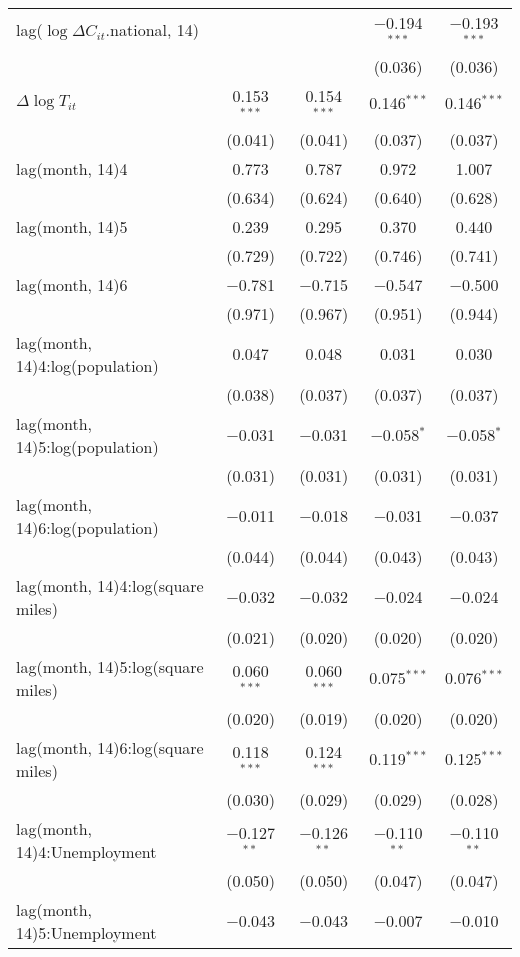 \begin{tabular}{@{\extracolsep{1pt}}lcccc}
  lag($\log \Delta C_{it}$.national, 14) &  &  & $-$0.194$^{***}$ & $-$0.193$^{***}$ \\ 
  &  &  & (0.036) & (0.036) \\ 
  $\Delta \log T_{it}$ & 0.153$^{***}$ & 0.154$^{***}$ & 0.146$^{***}$ & 0.146$^{***}$ \\ 
  & (0.041) & (0.041) & (0.037) & (0.037) \\ 
  lag(month, 14)4 & 0.773 & 0.787 & 0.972 & 1.007 \\ 
  & (0.634) & (0.624) & (0.640) & (0.628) \\ 
  lag(month, 14)5 & 0.239 & 0.295 & 0.370 & 0.440 \\ 
  & (0.729) & (0.722) & (0.746) & (0.741) \\ 
  lag(month, 14)6 & $-$0.781 & $-$0.715 & $-$0.547 & $-$0.500 \\ 
  & (0.971) & (0.967) & (0.951) & (0.944) \\ 
  lag(month, 14)4:log(population) & 0.047 & 0.048 & 0.031 & 0.030 \\ 
  & (0.038) & (0.037) & (0.037) & (0.037) \\ 
  lag(month, 14)5:log(population) & $-$0.031 & $-$0.031 & $-$0.058$^{*}$ & $-$0.058$^{*}$ \\ 
  & (0.031) & (0.031) & (0.031) & (0.031) \\ 
  lag(month, 14)6:log(population) & $-$0.011 & $-$0.018 & $-$0.031 & $-$0.037 \\ 
  & (0.044) & (0.044) & (0.043) & (0.043) \\ 
  lag(month, 14)4:log(square miles) & $-$0.032 & $-$0.032 & $-$0.024 & $-$0.024 \\ 
  & (0.021) & (0.020) & (0.020) & (0.020) \\ 
  lag(month, 14)5:log(square miles) & 0.060$^{***}$ & 0.060$^{***}$ & 0.075$^{***}$ & 0.076$^{***}$ \\ 
  & (0.020) & (0.019) & (0.020) & (0.020) \\ 
  lag(month, 14)6:log(square miles) & 0.118$^{***}$ & 0.124$^{***}$ & 0.119$^{***}$ & 0.125$^{***}$ \\ 
  & (0.030) & (0.029) & (0.029) & (0.028) \\ 
  lag(month, 14)4:Unemployment & $-$0.127$^{**}$ & $-$0.126$^{**}$ & $-$0.110$^{**}$ & $-$0.110$^{**}$ \\ 
  & (0.050) & (0.050) & (0.047) & (0.047) \\ 
  lag(month, 14)5:Unemployment & $-$0.043 & $-$0.043 & $-$0.007 & $-$0.010 \\ 

\end{tabular}
